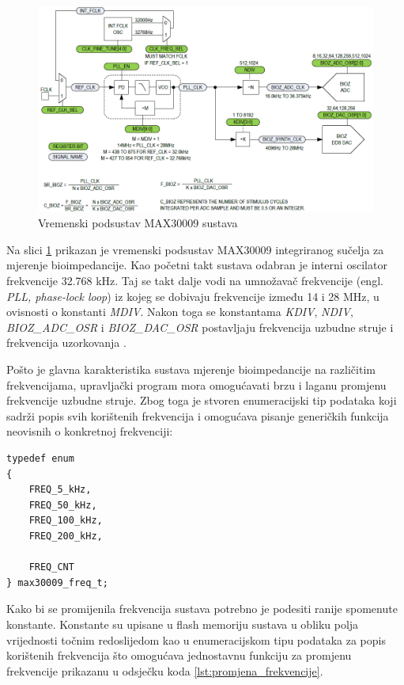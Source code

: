 \documentclass[../diplomski_rad.tex]{subfiles}
\begin{document}
\begin{figure}[htb]
    \centering
    \includegraphics[width=1\textwidth]{Figures/max30009_clock.png} 
    \caption{Vremenski podsustav MAX30009 sustava \cite{max30009_datasheet}}
    \label{slk:max_30009_clock}
\end{figure}

Na slici \ref{slk:max_30009_clock} prikazan je vremenski podsustav MAX30009 integriranog sučelja za mjerenje bioimpedancije.
Kao početni takt sustava odabran je interni oscilator frekvencije 32.768 kHz. Taj se takt dalje vodi na umnožavač frekvencije 
(engl. \textit{PLL, phase-lock loop}) iz kojeg se dobivaju frekvencije između 14 i 28 MHz, u ovisnosti o konstanti \textit{MDIV}. 
Nakon toga se konstantama \textit{KDIV}, \textit{NDIV}, 
\textit{BIOZ\_ADC\_OSR} i \textit{BIOZ\_DAC\_OSR} postavljaju frekvencija uzbudne struje i frekvencija uzorkovanja \cite{max30009_datasheet}.   

Pošto je glavna karakteristika sustava mjerenje bioimpedancije na različitim frekvencijama, upravljački program mora 
omogućavati brzu i laganu promjenu frekvencije uzbudne struje. Zbog toga je stvoren enumeracijski tip podataka koji 
sadrži popis svih korištenih frekvencija i omogućava pisanje generičkih funkcija neovisnih o konkretnoj frekvenciji: 
\begin{lstlisting}[label={lst:enumeracija_frekvencija},style=CStyle,caption={Enumeracijski tip podataka za odabir frekvencije rada},captionpos=b]
typedef enum
{
    FREQ_5_kHz,
    FREQ_50_kHz,
    FREQ_100_kHz,
    FREQ_200_kHz,
    
    FREQ_CNT
} max30009_freq_t;
\end{lstlisting} 

Kako bi se promijenila frekvencija sustava potrebno je podesiti ranije spomenute konstante. 
Konstante su upisane u flash memoriju sustava u obliku polja vrijednosti točnim redoslijedom kao 
u enumeracijskom tipu podataka za popis korištenih frekvencija što omogućava jednostavnu funkciju 
za promjenu frekvencije prikazanu u odsječku koda \ref{lst:promjena_frekvencije}. 
\end{document}
